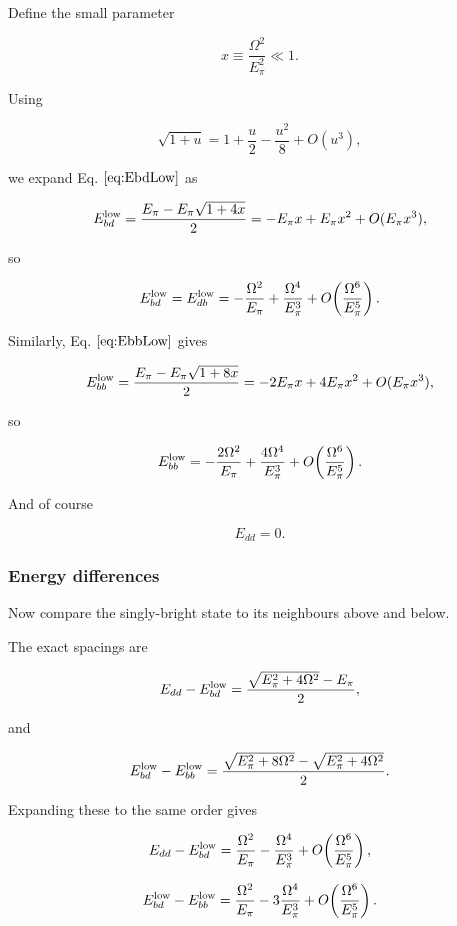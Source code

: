 \documentclass[
]{article}
\renewcommand{\[}{\begin{equation}}
\renewcommand{\]}{\end{equation}}
\begin{document}
Define the small parameter

\[
x\equiv \frac{\Omega^2}{E_\pi^2}\ll 1.
\label{eq:xSmall}
\]

Using

\[
\sqrt{1+u}=1+\frac{u}{2}-\frac{u^2}{8}+O(u^3),
\label{eq:sqrtExpand}
\]

we expand Eq. \(\ref{eq:EbdLow}\) as

\[
E_{bd}^{\rm low} =
\frac{E_\pi-E_\pi\sqrt{1+4x}}{2} =
-E_\pi x+E_\pi x^2+O(E_\pi x^3),
\label{eq:EbdExpandStep}
\]

so

\[
E_{bd}^{\rm low}=E_{db}^{\rm low} =
-\frac{\Omega^2}{E_\pi}
+
\frac{\Omega^4}{E_\pi^3}
+
O\!\left(\frac{\Omega^6}{E_\pi^5}\right).
\label{eq:EbdExpand}
\]

Similarly, Eq. \(\ref{eq:EbbLow}\) gives

\[
E_{bb}^{\rm low} =
\frac{E_\pi-E_\pi\sqrt{1+8x}}{2} =
-2E_\pi x+4E_\pi x^2+O(E_\pi x^3),
\label{eq:EbbExpandStep}
\]

so

\[
E_{bb}^{\rm low} =
-\frac{2\Omega^2}{E_\pi}
+
\frac{4\Omega^4}{E_\pi^3}
+
O\!\left(\frac{\Omega^6}{E_\pi^5}\right).
\label{eq:EbbExpand}
\]

And of course

\[
E_{dd}=0.
\label{eq:EddExpand}
\]

\subsubsection{Energy differences}\label{energy-differences}

Now compare the singly-bright state to its neighbours above and below.

The exact spacings are

\[
E_{dd}-E_{bd}^{\rm low} =
\frac{\sqrt{E_\pi^2+4\Omega^2}-E_\pi}{2},
\label{eq:ddMinusBdExact}
\]

and

\[
E_{bd}^{\rm low}-E_{bb}^{\rm low} =
\frac{\sqrt{E_\pi^2+8\Omega^2}-\sqrt{E_\pi^2+4\Omega^2}}{2}.
\label{eq:bdMinusBbExact}
\]

Expanding these to the same order gives

\[
E_{dd}-E_{bd}^{\rm low} =
\frac{\Omega^2}{E_\pi} -
\frac{\Omega^4}{E_\pi^3}
+
O\!\left(\frac{\Omega^6}{E_\pi^5}\right),
\label{eq:ddMinusBdExpand}
\]

\[
E_{bd}^{\rm low}-E_{bb}^{\rm low} =
\frac{\Omega^2}{E_\pi} -
3\frac{\Omega^4}{E_\pi^3}
+
O\!\left(\frac{\Omega^6}{E_\pi^5}\right).
\label{eq:bdMinusBbExpand}
\]
\end{document}
